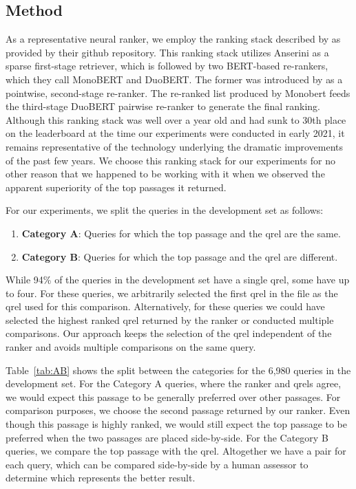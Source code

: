 \documentclass[fullpage]{article}
\begin{document}
\subsection{Method}

As a representative neural ranker, we employ the ranking stack described by \citet{nogueira2019multi} as provided by their github repository. This ranking stack utilizes Anserini as a sparse first-stage retriever, which is followed by two BERT-based re-rankers, which they call MonoBERT and DuoBERT. The former was introduced by \citet{nogueira2019passage} as a pointwise, second-stage re-ranker. The re-ranked list produced by Monobert feeds the third-stage DuoBERT pairwise re-ranker to generate the final ranking. Although this ranking stack was well over a year old and had sunk to 30th place on the leaderboard at the time our experiments were conducted in early 2021, it remains representative of the technology underlying the dramatic improvements of the past few years. We choose this ranking stack for our experiments for no other reason that we happened to be working with it when we observed the apparent superiority of the top passages it returned.

For our experiments, we split the queries in the development set as follows:
\begin{enumerate}
    \item {\bf Category A}: Queries for which the top passage and the qrel are the same.
    \item {\bf Category B}: Queries for which the top passage and the qrel are different.
\end{enumerate}
While 94\% of the queries in the development set have a single qrel, some have up to four. For these queries, we arbitrarily selected the first qrel in the file as the qrel used for this comparison. Alternatively, for these queries we could have selected the highest ranked qrel returned by the ranker or conducted multiple comparisons. Our approach keeps the selection of the qrel independent of the ranker and avoids multiple comparisons on the same query.

Table~\ref{tab:AB} shows the split between the categories for the 6,980 queries in the development set. For the Category A queries, where the ranker and qrels agree, we would expect this passage to be generally preferred over other passages. For comparison purposes, we choose the second passage returned by our ranker. Even though this passage is highly ranked, we would still expect the top passage to be preferred when the two passages are placed side-by-side. For the Category B queries, we compare the top passage with the qrel. Altogether we have a pair for each query, which can be compared side-by-side by a human assessor to determine which represents the better result.
\end{document}
